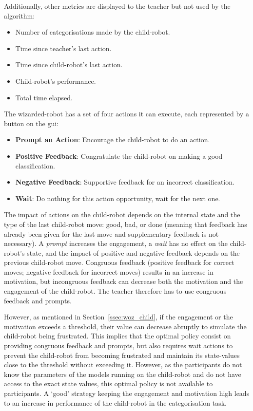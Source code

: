 Additionally, other metrics are displayed to the teacher but not used by the algorithm:
\begin{itemize}
	\item Number of categorisations made by the child-robot.
	\item Time since teacher's last action.
	\item Time since child-robot's last action.
	\item Child-robot's performance.
	\item Total time elapsed.
\end{itemize}

The wizarded-robot has a set of four actions it can execute, each represented by a button on the \gls{gui}: 
\begin{itemize}
	\item \textbf{Prompt an Action}: Encourage the child-robot to do an action.
	\item \textbf{Positive Feedback}: Congratulate the child-robot on making a good classification.
	\item \textbf{Negative Feedback}: Supportive feedback for an incorrect classification.
	\item \textbf{Wait}: Do nothing for this action opportunity, wait for the next one.
\end{itemize}

The impact of actions on the child-robot depends on the internal state and the type of the last child-robot move: good, bad, or done (meaning that feedback has already been given for the last move and supplementary feedback is not necessary). A \textit{prompt} increases the engagement, a \textit{wait} has no effect on the child-robot's state, and the impact of positive and negative feedback depends on the previous child-robot move. Congruous feedback (positive feedback for correct moves; negative feedback for incorrect moves) results in an increase in motivation, but incongruous feedback can decrease both the motivation and the engagement of the child-robot. The teacher therefore has to use congruous feedback and prompts.

However, as mentioned in Section~\ref{ssec:woz_child}, if the engagement or the motivation exceeds a threshold, their value can decrease abruptly to simulate the child-robot being frustrated. This implies that the optimal policy consist on providing congruous feedback and prompts, but also requires wait actions to prevent the child-robot from becoming frustrated and maintain its state-values close to the threshold without exceeding it. However, as the participants do not know the parameters of the models running on the child-robot and do not have access to the exact state values, this optimal policy is not available to participants. A `good' strategy keeping the engagement and motivation high leads to an increase in performance of the child-robot in the categorisation task.

